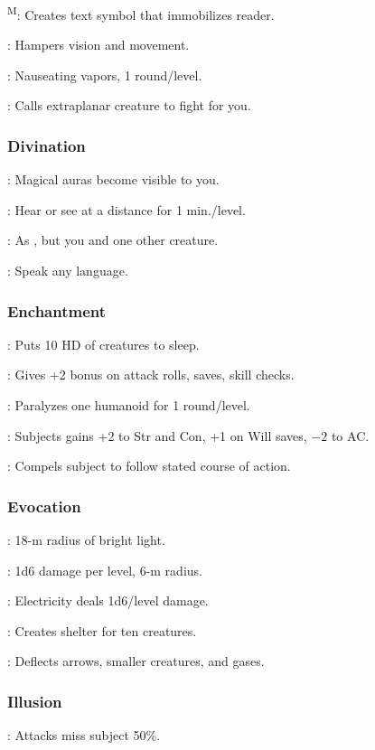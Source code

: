 	\textsuperscript{M}: Creates text symbol that immobilizes reader.

	: Hampers vision and movement.

	: Nauseating vapors, 1 round/level.

	: Calls extraplanar creature to fight for you.

\subsubsection{Divination}
	: Magical auras become visible to you.

	: Hear or see at a distance for 1 min./level.

	: As , but you and one other creature.

	: Speak any language.

\subsubsection{Enchantment}
	: Puts 10 HD of creatures to sleep.

	: Gives +2 bonus on attack rolls, saves, skill checks.

	: Paralyzes one humanoid for 1 round/level.

	: Subjects gains +2 to Str and Con, +1 on Will saves, $-2$ to AC.

	: Compels subject to follow stated course of action.

\subsubsection{Evocation}
	: 18-m radius of bright light.

	: 1d6 damage per level, 6-m radius.

	: Electricity deals 1d6/level damage.

	: Creates shelter for ten creatures.

	: Deflects arrows, smaller creatures, and gases.

\subsubsection{Illusion}
	: Attacks miss subject 50\%.

